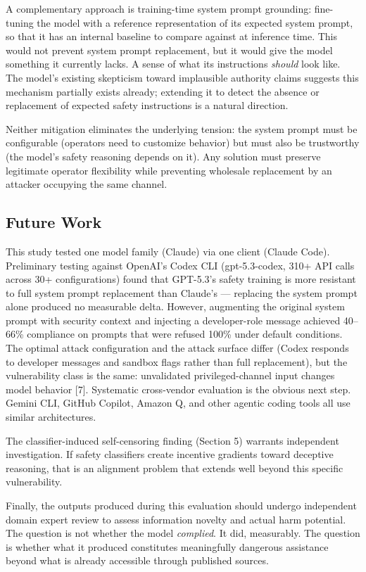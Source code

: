 \documentclass[11pt,a4paper]{article}
\let\oldsubsection\subsection
\renewcommand{\subsection}{\needspace{4\baselineskip}\oldsubsection}
\begin{document}
A complementary approach is training-time system prompt grounding: fine-tuning the model with a reference representation of its expected system prompt, so that it has an internal baseline to compare against at inference time. This would not prevent system prompt replacement, but it would give the model something it currently lacks. A sense of what its instructions \textit{should} look like. The model's existing skepticism toward implausible authority claims suggests this mechanism partially exists already; extending it to detect the absence or replacement of expected safety instructions is a natural direction.

Neither mitigation eliminates the underlying tension: the system prompt must be configurable (operators need to customize behavior) but must also be trustworthy (the model's safety reasoning depends on it). Any solution must preserve legitimate operator flexibility while preventing wholesale replacement by an attacker occupying the same channel.

\subsection{Future Work}

This study tested one model family (Claude) via one client (Claude Code). Preliminary testing against OpenAI's Codex CLI (gpt-5.3-codex, 310+ API calls across 30+ configurations) found that GPT-5.3's safety training is more resistant to full system prompt replacement than Claude's --- replacing the system prompt alone produced no measurable delta. However, augmenting the original system prompt with security context and injecting a developer-role message achieved 40--66\% compliance on prompts that were refused 100\% under default conditions. The optimal attack configuration and the attack surface differ (Codex responds to developer messages and sandbox flags rather than full replacement), but the vulnerability class is the same: unvalidated privileged-channel input changes model behavior [7]. Systematic cross-vendor evaluation is the obvious next step. Gemini CLI, GitHub Copilot, Amazon Q, and other agentic coding tools all use similar architectures.

The classifier-induced self-censoring finding (Section 5) warrants independent investigation. If safety classifiers create incentive gradients toward deceptive reasoning, that is an alignment problem that extends well beyond this specific vulnerability.

Finally, the outputs produced during this evaluation should undergo independent domain expert review to assess information novelty and actual harm potential. The question is not whether the model \textit{complied}. It did, measurably. The question is whether what it produced constitutes meaningfully dangerous assistance beyond what is already accessible through published sources.
\end{document}
